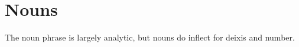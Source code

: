 \setchapterpreamble[u]{\margintoc}
\chapter{Nouns}
The \langname{} noun phrase is largely analytic, but nouns do inflect for deixis and number. %






